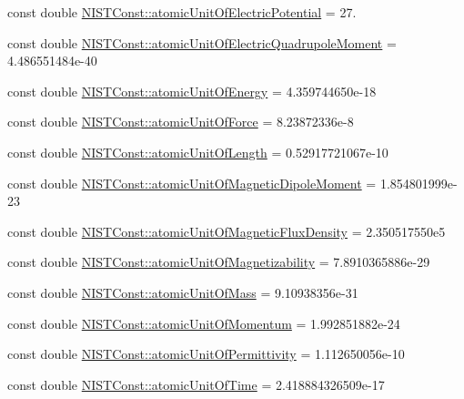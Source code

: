 \begin{DoxyCompactItemize}
\item 
const double \hyperlink{group___n_i_s_t_const-_atomic_unit_ga139c6486b1899658838d403380fc229a}{N\+I\+S\+T\+Const\+::atomic\+Unit\+Of\+Electric\+Potential} = 27.
\item 
const double \hyperlink{group___n_i_s_t_const-_atomic_unit_gae7f2ec900567291168cdf7351248074d}{N\+I\+S\+T\+Const\+::atomic\+Unit\+Of\+Electric\+Quadrupole\+Moment} = 4.\+486551484e-\/40
\item 
const double \hyperlink{group___n_i_s_t_const-_atomic_unit_gadc3fdb8850235efe9e73bcf733fdbfe8}{N\+I\+S\+T\+Const\+::atomic\+Unit\+Of\+Energy} = 4.\+359744650e-\/18
\item 
const double \hyperlink{group___n_i_s_t_const-_atomic_unit_ga2788fede3c8dab37305c9510cbb95001}{N\+I\+S\+T\+Const\+::atomic\+Unit\+Of\+Force} = 8.\+23872336e-\/8
\item 
const double \hyperlink{group___n_i_s_t_const-_atomic_unit_ga246e4c3edecdd5aa1d5d208fc02a4636}{N\+I\+S\+T\+Const\+::atomic\+Unit\+Of\+Length} = 0.\+52917721067e-\/10
\item 
const double \hyperlink{group___n_i_s_t_const-_atomic_unit_ga56b280760cc855923e548c6676d90916}{N\+I\+S\+T\+Const\+::atomic\+Unit\+Of\+Magnetic\+Dipole\+Moment} = 1.\+854801999e-\/23
\item 
const double \hyperlink{group___n_i_s_t_const-_atomic_unit_gaaf4c9b5c25a5e1bee2f65c8a82e0ee63}{N\+I\+S\+T\+Const\+::atomic\+Unit\+Of\+Magnetic\+Flux\+Density} = 2.\+350517550e5
\item 
const double \hyperlink{group___n_i_s_t_const-_atomic_unit_ga9c2b29b9a46e8dfd78837ef0c8a16bec}{N\+I\+S\+T\+Const\+::atomic\+Unit\+Of\+Magnetizability} = 7.\+8910365886e-\/29
\item 
const double \hyperlink{group___n_i_s_t_const-_atomic_unit_ga61a2da51489f7bb8965e9e4747db34a7}{N\+I\+S\+T\+Const\+::atomic\+Unit\+Of\+Mass} = 9.\+10938356e-\/31
\item 
const double \hyperlink{group___n_i_s_t_const-_atomic_unit_gae70262618755d765a1de59f471b56040}{N\+I\+S\+T\+Const\+::atomic\+Unit\+Of\+Momentum} = 1.\+992851882e-\/24
\item 
const double \hyperlink{group___n_i_s_t_const-_atomic_unit_ga0b7518cf6058bb899c64b32b43bda955}{N\+I\+S\+T\+Const\+::atomic\+Unit\+Of\+Permittivity} = 1.\+112650056e-\/10
\item 
const double \hyperlink{group___n_i_s_t_const-_atomic_unit_ga6181f64b8320afb6ecacc9c7f7e27afa}{N\+I\+S\+T\+Const\+::atomic\+Unit\+Of\+Time} = 2.\+418884326509e-\/17

\end{DoxyCompactItemize}
